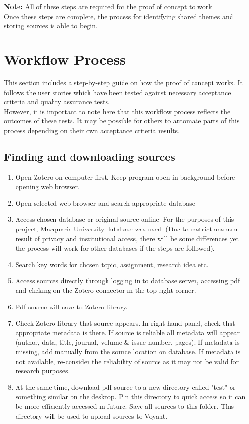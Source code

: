 \documentclass{article}
\begin{document}
\textbf{Note:} All of these steps are required for the proof of concept to work.\\
Once these steps are complete, the process for identifying shared themes and storing sources is able to begin. 

\section{Workflow Process}
This section includes a step-by-step guide on how the proof of concept works. It follows the user stories which have been tested against necessary acceptance criteria and quality assurance tests.\\
However, it is important to note here that this workflow process reflects the outcomes of these tests. It may be possible for others to automate parts of this process depending on their own acceptance criteria results.
\subsection{Finding and downloading sources}
\begin{enumerate}
\item Open Zotero on computer first. Keep program open in background before opening web browser.
\item Open selected web browser and search appropriate database.
    \item Access chosen database or original source online. For the purposes of this project, Macquarie University database was used. (Due to restrictions as a result of privacy and institutional access, there will be some differences yet the process will work for other databases if the steps are followed).
    \item Search key words for chosen topic, assignment, research idea etc.
    \item Access sources directly through logging in to database server, accessing pdf and clicking on the Zotero connector in the top right corner.
    \item Pdf source will save to Zotero library.
     \item Check Zotero library that source appears. In right hand panel, check that appropriate metadata is there. If source is reliable all metadata will appear (author, data, title, journal, volume & issue number, pages). If metadata is missing, add manually from the source location on database. If metadata is not available, re-consider the reliability of source as it may not be valid for research purposes.
    \item At the same time, download pdf source to a new directory called "test" or something similar on the desktop. Pin this directory to quick access so it can be more efficiently accessed in future. Save all sources to this folder. This directory will be used to upload sources to Voyant. 
  \end{enumerate}
\end{document}
